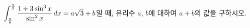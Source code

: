 $\displaystyle\int_{\frac{\pi}{6}}^{\frac{\pi}{3}}\dfrac{1+3\sin^3 x}{\sin^2 x}\mkern3mu dx=a\sqrt{3}+b$일 때, 유리수 $a$, $b$에 대하여 $a+b$의 값을 구하시오.
